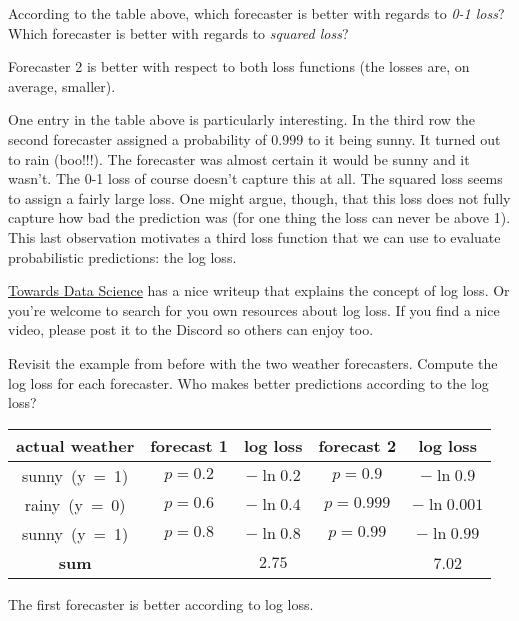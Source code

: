 \documentclass[assignment03_Solutions]{subfiles}
\begin{document}
\vspace{1em}

\begin{understandingcheck}
According to the table above, which forecaster is better with regards to \emph{0-1 loss}?  Which forecaster is better with regards to \emph{squared loss}?

\begin{boxedsolution}
Forecaster 2 is better with respect to both loss functions (the losses are, on average, smaller).
\end{boxedsolution}
\end{understandingcheck}

One entry in the table above is particularly interesting.  In the third row the second forecaster assigned a probability of $0.999$ to it being sunny.  It turned out to rain (boo!!!).  The forecaster was almost certain it would be sunny and it wasn't.  The 0-1 loss of course doesn't capture this at all.  The squared loss seems to assign a fairly large loss.  One might argue, though, that this loss does not fully capture how bad the prediction was (for one thing the loss can never be above 1).  This last observation motivates a third loss function that we can use to evaluate probabilistic predictions: the log loss.
\vspace{1em}
\begin{externalresources}[(30 minutes)]
\href{https://towardsdatascience.com/intuition-behind-log-loss-score-4e0c9979680a}{Towards Data Science} has a nice writeup that explains the concept of log loss.  Or you're welcome to search for you own resources about log loss. If you find a nice video, please post it to the Discord so others can enjoy too.
\begin{exercise}
Revisit the example from before with the two weather forecasters.  Compute the log loss for each forecaster.  Who makes better predictions according to the log loss?
\begin{boxedsolution}
\begin{center}
\small
\begin{tabular}{c | c | c | c | c }
\hline
actual weather & forecast 1 & log loss & forecast 2 & log loss \\
\hline
\mbox{sunny (y = 1)} & $p = 0.2$ & $-\ln 0.2$ & $p = 0.9$ &  $-\ln 0.9$\\
\mbox{rainy (y = 0)} & $p = 0.6$  &  $-\ln 0.4$ & $p = 0.999$ &  $-\ln 0.001$\\ 
\mbox{sunny (y = 1)} & $p = 0.8$ & $-\ln 0.8$ & $p = 0.99$ & $-\ln 0.99$\\
\hline
\textbf{sum} & & $2.75$ &  & 7.02
\end{tabular}
\end{center}
The first forecaster is better according to log loss.

\end{boxedsolution}

\end{exercise}
\end{externalresources}
\end{document}
